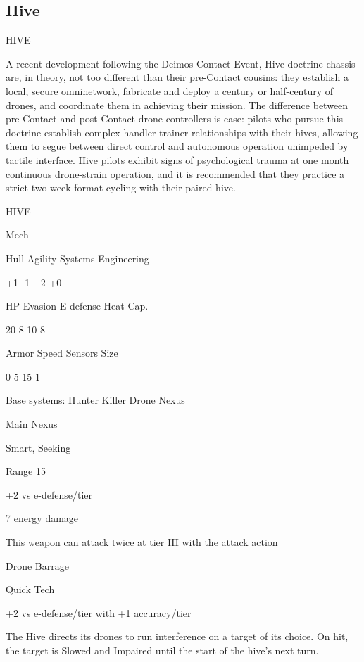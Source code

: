 \subsection{Hive}

                                                   HIVE  

A recent development following the Deimos Contact Event, Hive doctrine chassis are, in theory,  
not too different than their pre-Contact cousins: they establish a local, secure omninetwork,  
fabricate and deploy a century or half-century of drones, and coordinate them in achieving their  
mission. The difference between pre-Contact and post-Contact drone controllers is ease: pilots  
who pursue this doctrine establish complex handler-trainer relationships with their hives, allowing  
them to segue between direct control and autonomous operation unimpeded by tactile interface.  
Hive pilots exhibit signs of psychological trauma at one month continuous drone-strain operation,  
and it is recommended that they practice a strict two-week format cycling with their paired hive.   

 HIVE 

 Mech 

 Hull       Agility      Systems       Engineering 

 +1         -1           +2            +0 

 HP         Evasion      E-defense     Heat Cap. 

 20         8            10            8 

 Armor      Speed        Sensors       Size 

 0          5            15            1 

Base systems:  
Hunter Killer Drone Nexus
 
Main Nexus
 
Smart, Seeking
 
Range 15
 
+2 vs e-defense/tier
 
7 energy damage
 
This weapon can attack twice at tier III with the attack action
 

Drone Barrage
 
Quick Tech
 
+2 vs e-defense/tier with +1 accuracy/tier
 
The Hive directs its drones to run interference on a target of its choice. On hit, the target is  
Slowed and Impaired until the start of the hive’s next turn.
 

